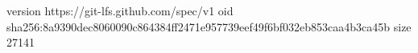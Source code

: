 version https://git-lfs.github.com/spec/v1
oid sha256:8a9390dec8060090c864384ff2471e957739eef49f6bf032eb853caa4b3ca45b
size 27141
